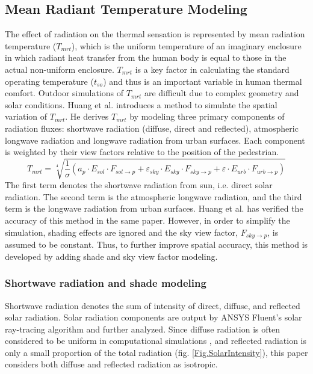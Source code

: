 \documentclass[preprint,3p,12pt,english]{elsarticle}
\begin{document}
\subsection{Mean Radiant Temperature Modeling}
The effect of radiation on the thermal sensation is represented by mean radiation temperature ($T_{mrt}$), which is the uniform temperature of an imaginary enclosure in which radiant heat transfer from the human body is equal to those in the actual non-uniform enclosure. $T_{mrt}$ is a key factor in calculating the standard operating temperature ($t_{so}$) and thus is an important variable in human thermal comfort. Outdoor simulations of $T_{mrt}$ are difficult due to complex geometry and solar conditions. Huang et al. \cite{huang2014citycomfort+} introduces a method to simulate the spatial variation of $T_{mrt}$. He derives $T_{mrt}$ by modeling three primary components of radiation fluxes: shortwave radiation (diffuse, direct and reflected), atmospheric longwave radiation and longwave radiation from urban surfaces. Each component is weighted by their view factors relative to the position of the pedestrian.
\begin{equation}
T_{mrt}=\sqrt[4]{\frac{1}{\sigma}(a_{p}{\cdot}E_{sol}{\cdot}F_{sol\rightarrow{p}}+\varepsilon_{sky}{\cdot}E_{sky}{\cdot}F_{sky\rightarrow{p}}+\varepsilon{\cdot}E_{urb}{\cdot}F_{urb\rightarrow{p}})}
\label{Equ.MRT}
\end{equation}
The first term denotes the shortwave radiation from sun, i.e. direct solar radiation. The second term is the atmospheric longwave radiation, and the third term is the longwave radiation from urban surfaces. Huang et al. has verified the accuracy of this method in the same paper\cite{huang2014citycomfort+}. However, in order to simplify the simulation, shading effects are ignored and the sky view factor, $F_{sky\rightarrow{p}}$, is assumed to be constant. Thus, to further improve spatial accuracy, this method is developed by adding shade and sky view factor modeling.

\subsubsection{Shortwave radiation and shade modeling}
Shortwave radiation denotes the sum of intensity of direct, diffuse, and reflected solar radiation. Solar radiation components are output by ANSYS Fluent's solar ray-tracing algorithm and further analyzed. Since diffuse radiation is often considered to be uniform in computational simulations \cite{flint1998solar, sreekumar1998egret, madronich1999role}, and reflected radiation is only a small proportion of the total radiation (fig. \ref{Fig.SolarIntensity}), this paper considers both diffuse and reflected radiation as isotropic. 
\end{document}
